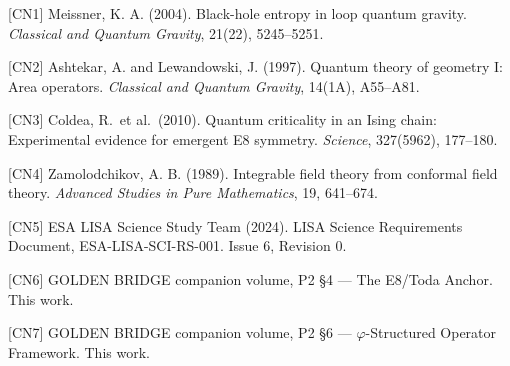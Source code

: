 [CN1] Meissner, K. A. (2004). Black-hole entropy in loop quantum
gravity. \emph{Classical and Quantum Gravity}, 21(22), 5245--5251.

[CN2] Ashtekar, A. and Lewandowski, J. (1997). Quantum theory of
geometry I: Area operators. \emph{Classical and Quantum Gravity},
14(1A), A55--A81.

[CN3] Coldea, R.\ et al.\ (2010). Quantum criticality in an Ising
chain: Experimental evidence for emergent E8 symmetry. \emph{Science},
327(5962), 177--180.

[CN4] Zamolodchikov, A. B. (1989). Integrable field theory from
conformal field theory. \emph{Advanced Studies in Pure Mathematics},
19, 641--674.

[CN5] ESA LISA Science Study Team (2024). LISA Science Requirements
Document, ESA-LISA-SCI-RS-001. Issue 6, Revision 0.

[CN6] GOLDEN BRIDGE companion volume, P2 \S4 --- The E8/Toda Anchor.
This work.

[CN7] GOLDEN BRIDGE companion volume, P2 \S6 --- $\varphi$-Structured
Operator Framework. This work.


